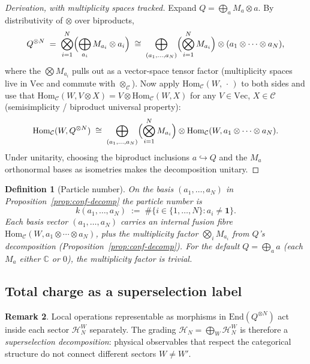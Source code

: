 \documentclass[11pt,a4paper]{article}
\newtheorem{definition}{Definition}[section]
\theoremstyle{definition}
\newtheorem{remark}[definition]{Remark}
\newcommand{\Cc}{\mathcal{C}}
\newcommand{\Hh}{\mathcal{H}}
\newcommand{\Hom}{\mathrm{Hom}}
\newcommand{\End}{\mathrm{End}}
\newcommand{\one}{\mathbf{1}}
\begin{document}
\begin{proof}[Derivation, with multiplicity spaces tracked]
Expand $Q = \bigoplus_a M_a\otimes a$. By distributivity of $\otimes$ over
biproducts,
\[
Q^{\otimes N}
\;=\; \bigotimes_{i=1}^{N} \Bigl(\bigoplus_{a_i} M_{a_i}\otimes a_i\Bigr)
\;\cong\; \bigoplus_{(a_1,\dots,a_N)}
\Bigl(\bigotimes_{i=1}^{N} M_{a_i}\Bigr)\otimes (a_1\otimes\cdots\otimes a_N),
\]
where the $\bigotimes M_{a_i}$ pulls out as a vector-space tensor factor
(multiplicity spaces live in $\mathrm{Vec}$ and commute with $\otimes_\Cc$).
Now apply $\Hom_\Cc(W,\,\cdot\,)$ to both sides and use that
$\Hom_\Cc(W, V\otimes X) = V\otimes\Hom_\Cc(W, X)$ for any
$V\in\mathrm{Vec}$, $X\in\Cc$ (semisimplicity / biproduct universal
property):
\[
\Hom_\Cc(W, Q^{\otimes N})
\;\cong\; \bigoplus_{(a_1,\dots,a_N)}
\Bigl(\bigotimes_{i=1}^{N} M_{a_i}\Bigr)
\otimes \Hom_\Cc(W, a_1\otimes\cdots\otimes a_N).
\]
Under unitarity, choosing the biproduct inclusions $a\hookrightarrow Q$ and
the $M_a$ orthonormal bases as isometries makes the decomposition unitary.
\end{proof}

\begin{definition}[Particle number]\label{def:particle-number}
On the basis $(a_1,\dots,a_N)$ in Proposition~\ref{prop:conf-decomp} the
\emph{particle number} is
\[
k(a_1,\dots,a_N) \;:=\; \#\{i \in\{1,\dots,N\} : a_i \neq \one\}.
\]
Each basis vector $(a_1,\dots,a_N)$ carries an internal \emph{fusion fibre}
$\Hom_\Cc(W, a_1\otimes\cdots\otimes a_N)$, plus the multiplicity factor
$\bigotimes_i M_{a_i}$ from $Q$'s decomposition
(Proposition~\ref{prop:conf-decomp}). For the default
$Q = \bigoplus_a a$ (each $M_a$ either $\mathbb{C}$ or $0$), the
multiplicity factor is trivial.
\end{definition}

\subsection{Total charge as a superselection label}

\begin{remark}\label{rem:supersel}
Local operations representable as morphisms in $\End(Q^{\otimes N})$ act
inside each sector $\Hh_N^{W}$ separately. The grading
$\Hh_N = \bigoplus_W \Hh_N^{W}$ is therefore a \emph{superselection
decomposition}: physical observables that respect the categorical structure
do not connect different sectors $W \neq W'$.
\end{remark}
\end{document}

